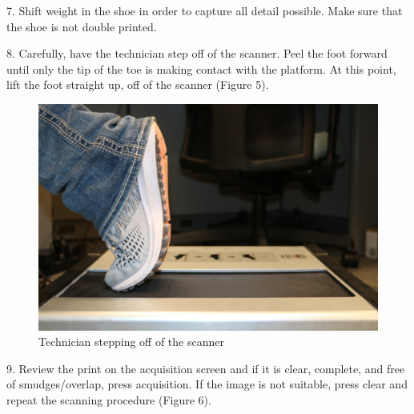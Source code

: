 \newpage

7.	Shift weight in the shoe in order to capture all detail possible. Make sure that the shoe is not double printed. 

8.	Carefully, have the technician step off of the scanner. Peel the foot forward until only the tip of the toe is making contact with the platform. At this point, lift the foot straight up, off of the scanner (Figure 5). 

\begin{figure}[!htp]
\centering
\includegraphics[scale=0.3]{2D_Step_off}
\caption{Technician stepping off of the scanner}
\label{Image 5}
\end{figure}


9.	Review the print on the acquisition screen and if it is clear, complete, and free of smudges/overlap, press acquisition. If the image is not suitable, press clear and repeat the scanning procedure (Figure 6).  

